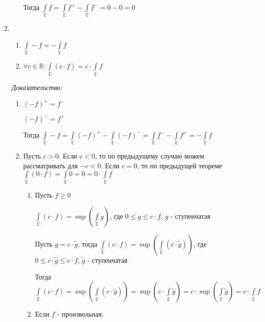 \documentclass[paper=a4, fontsize=13.2pt]{article}
\begin{document}
\begin{enumerate}
\begin{enumerate}
		Тогда $\int\limits_\mathds{E} f = \int\limits_{\mathds{E}} f^+ - \int\limits_{\mathds{E}} f^- = 0 - 0 = 0$
	\end{enumerate}

	\item
	\begin{enumerate}
		\item
		$\int\limits_{\mathds{E}} -f = - \int\limits_{\mathds{E}} f$

		\item
		$\forall c \in \mathds{R}: \int\limits_{\mathds{E}} (c \cdot f) = c \cdot \int\limits_{\mathds{E}} f $
	\end{enumerate}

	\emph{Доказательство:}
	\begin{enumerate}
		\item
		$(-f)^+ = f^-$

		$(-f)^- = f^+$

		Тогда $\int\limits_{\mathds{E}} -f = \int\limits_{\mathds{E}} (-f)^+ - \int\limits_{\mathds{E}} (-f)^- = \int\limits_{\mathds{E}} f^- - \int\limits_{\mathds{E}} f^+ = -\int\limits_{\mathds{E}} f$

		\item

		Пусть $c > 0$. Если $c < 0$, то по предыдущему случаю можем рассматривать для $- c < 0$. Если $c = 0$, то по предыдущей теореме $\int\limits_{\mathds{E}} (0 \cdot f) = \int\limits_{\mathds{E}} 0 = 0 = 0 \cdot \int\limits_{\mathds{E}} f$

		\begin{enumerate}
			\item
			Пусть $f \geqslant 0$

			$\int\limits_{\mathds{E}} (c \cdot f) = \sup (\int\limits_{\mathds{E}} g)$, где $0 \leqslant g \leqslant c \cdot f$, $g$ - ступенчатая

			Пусть $g = c \cdot \widetilde{g}$, тогда $\int\limits_{\mathds{E}} (c \cdot f) = \sup (\int\limits_{\mathds{E}} (c \cdot \widetilde{g}))$, где $0 \leqslant c \cdot \widetilde{g} \leqslant c \cdot f$, $\widetilde{g}$ - ступенчатая

			Тогда $\int\limits_{\mathds{E}} (c \cdot f) = \sup (\int\limits_{\mathds{E}} (c \cdot \widetilde{g})) = \sup (c \cdot \int\limits_{\mathds{E}} \widetilde{g}) = c \cdot \sup (\int\limits_{\mathds{E}} \widetilde{g}) = c \cdot \int\limits_{\mathds{E}} f $

			\item Если $f$ - произвольная:


\end{enumerate}
\end{enumerate}
\end{enumerate}
\end{document}
